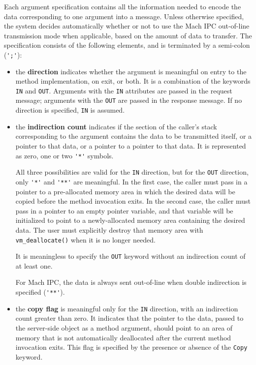Each argument specification contains all the information needed to
encode the data corresponding to one argument into a message. Unless
otherwise specified, the system decides automatically whether or not
to use the Mach IPC out-of-line transmission mode when applicable,
based on the amount of data to transfer. The specification consists of
the following elements, and is terminated by a semi-colon
(\verb|';'|):
\begin{itemize}
\item the {\bf direction} indicates whether the argument is meaningful
on entry to the method implementation, on exit, or both. It is a
combination of the keywords \verb|IN| and \verb|OUT|. Arguments with
the \verb|IN| attributes are passed in the request message; arguments
with the \verb|OUT| are passed in the response message. If no
direction is specified, \verb|IN| is assumed.

\item the {\bf indirection count} indicates if the section of the
caller's stack corresponding to the argument contains the data to be
transmitted itself, or a pointer to that data, or a pointer to a
pointer to that data. It is represented as zero, one or two \verb|'*'|
symbols.

All three possibilities are valid for the \verb|IN| direction, but for
the \verb|OUT| direction, only \verb|'*'| and \verb|'**'| are
meaningful. In the first case, the caller must pass in a pointer to a
pre-allocated memory area in which the desired data will be copied
before the method invocation exits. In the second case, the caller
must pass in a pointer to an empty pointer variable, and that variable
will be initialized to point to a newly-allocated memory area
containing the desired data. The user must explicitly destroy that
memory area with \verb|vm_deallocate()| when it is no longer needed.

It is meaningless to specify the \verb|OUT| keyword without an
indirection count of at least one.

For Mach IPC, the data is always sent out-of-line when double
indirection is specified (\verb|'**'|).

\item the {\bf copy flag} is meaningful only for the \verb|IN|
direction, with an indirection count greater than zero. It indicates
that the pointer to the data, passed to the server-side object as a
method argument, should point to an area of memory that is not
automatically deallocated after the current method invocation exits.
This flag is specified by the presence or absence of the \verb|Copy|
keyword.


\end{itemize}
